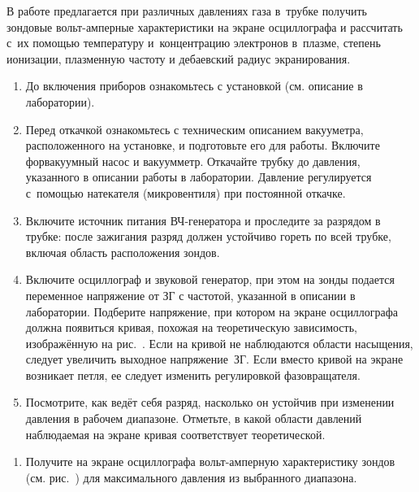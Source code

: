 \begin{lab:task}

В работе предлагается при различных давлениях газа в~трубке получить зондовые
вольт-амперные характеристики на экране
осциллографа и рассчитать с~их помощью температуру и~концентрацию электронов
в~плазме, степень ионизации, плазменную
частоту и дебаевский радиус экранирования.


\begin{enumerate}
\item До включения приборов ознакомьтесь с установкой (см. описание в
лаборатории).

\item Перед откачкой ознакомьтесь с техническим описанием вакууметра,
расположенного на установке, и подготовьте его для работы. Включите форвакуумный
насос и вакуумметр. Откачайте трубку до давления, указанного в описании работы в
лаборатории. Давление
регулируется с~помощью натекателя (микровентиля) при постоянной откачке.

\item Включите источник питания ВЧ-генератора и проследите за разрядом в трубке:
после зажигания разряд должен устойчиво
гореть по всей трубке, включая область расположения зондов.


\item  Включите осциллограф и звуковой генератор, при этом на зонды подается
переменное напряжение от ЗГ с частотой, указанной в описании в лаборатории.
Подберите напряжение, при котором на экране осциллографа должна появиться
кривая, похожая на теоретическую зависимость, изображённую на
рис.~.
Если на кривой не наблюдаются области насыщения, следует увеличить выходное
напряжение~ЗГ. Если вместо кривой на экране возникает петля, ее следует изменить
регулировкой фазовращателя.

\item Посмотрите, как ведёт себя разряд, насколько он устойчив при изменении
давления в
рабочем диапазоне. Отметьте, в какой области давлений наблюдаемая на экране
кривая соответствует
теоретической.
\end{enumerate}


\begin{enumerate}
\item Получите на экране осциллографа вольт-амперную характеристику зондов
(см. рис.~) для максимального давления из
выбранного диапазона.


\end{enumerate}
\end{lab:task}
